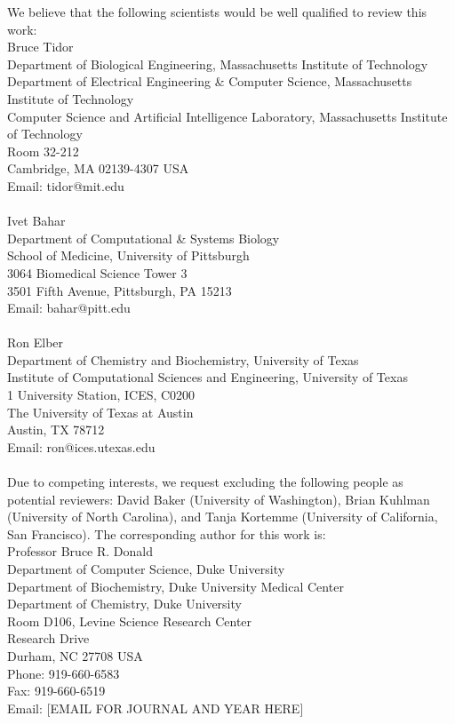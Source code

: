 \documentclass[11pt, oneside]{article}   	%
\begin{document}
We believe that the following scientists would be well qualified to review this work:
\\
\hspace{-0.285in} Bruce Tidor \\Department of Biological Engineering, Massachusetts Institute of Technology \\Department of Electrical Engineering \& Computer Science, Massachusetts Institute of Technology \\Computer Science and Artificial Intelligence Laboratory, Massachusetts Institute of Technology \\Room 32-212 \\Cambridge, MA 02139-4307 USA \\Email: tidor@mit.edu \\
 \\\hspace{-0.285in} Ivet Bahar \\Department of Computational \& Systems Biology \\School of Medicine, University of Pittsburgh \\3064 Biomedical Science Tower 3 \\3501 Fifth Avenue, Pittsburgh, PA 15213 \\Email: bahar@pitt.edu \\
  \\\hspace{-0.285in} Ron Elber \\Department of Chemistry and Biochemistry, University of Texas \\Institute of Computational Sciences and Engineering, University of Texas \\1 University Station, ICES, C0200 \\The University of Texas at Austin \\Austin, TX 78712 \\Email: ron@ices.utexas.edu \\
   \\Due to competing interests, we request excluding the following people as potential reviewers: David Baker (University of Washington), Brian Kuhlman (University of North Carolina), and Tanja Kortemme (University of California, San Francisco).  The corresponding author for this work is:
    \\\hspace{-0.285in} Professor Bruce R. Donald \\Department of Computer Science, Duke University \\Department of Biochemistry, Duke University Medical Center  \\Department of Chemistry, Duke University \\Room D106, Levine Science Research Center \\Research Drive \\Durham, NC 27708 USA \\Phone: 919-660-6583 \\Fax: 919-660-6519 \\Email: [EMAIL FOR JOURNAL AND YEAR HERE] \\
\end{document}

